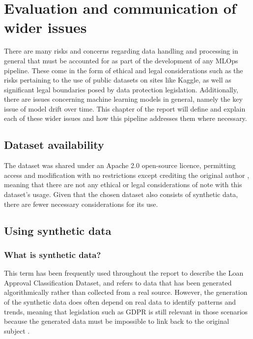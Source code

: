 \documentclass[12pt]{report}
\begin{document}




\chapter{Evaluation and communication of wider issues}
There are many risks and concerns regarding data handling and processing in general that must be accounted 
for as part of the development of any MLOps pipeline. These come in the form of ethical and legal considerations
such as the risks pertaining to the use of public datasets on sites like Kaggle, as well as significant legal 
boundaries posed by data protection legislation. Additionally, there are issues concerning machine learning models 
in general, namely the key issue of model drift over time. This chapter of the report will define and explain each 
of these wider issues and how this pipeline addresses them where necessary.

\section{Dataset availability}
The dataset was shared under an Apache 2.0 open-source licence, permitting access and modification with no restrictions
except crediting the original author \autocite{apache_apache_nodate}, meaning that there are not any ethical or legal 
considerations of note with this dataset's usage. Given that the chosen dataset also consists of synthetic data,
there are fewer necessary considerations for its use.

\section{Using synthetic data}
\subsection{What is synthetic data?}
This term has been frequently used throughout the report to describe the Loan Approval Classification Dataset, and refers to 
data that has been generated algorithmically rather than collected from a real source. However, the generation of the 
synthetic data does often depend on real data to identify patterns and trends, meaning that legislation such as GDPR is still relevant
in those scenarios because the generated data must be impossible to link back to the original subject \autocite{Lopez2022OnTL}.
\end{document}
